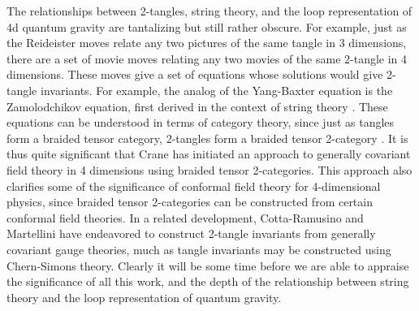 The relationships between 2-tangles, string theory, and the loop
representation of 4d quantum gravity are tantalizing but still rather
obscure.   For example, just as the Reideister moves relate any two
pictures of the same tangle in 3 dimensions, there are a set of movie moves
relating any two movies of the same 2-tangle in 4 dimensions.   These moves
give a set of equations whose solutions would give 2-tangle invariants.
For example, the analog of the Yang-Baxter equation is the Zamolodchikov
equation, first derived in the context of string theory \cite{Zam}.   These
equations can be understood in terms of category theory, since just as
tangles form a braided tensor category, 2-tangles form a braided tensor
2-category \cite{Fischer}.  It is thus quite significant that Crane
\cite{Crane} has initiated an approach to generally covariant field theory
in 4 dimensions using braided tensor 2-categories. This approach also
clarifies some of the significance of conformal field theory for
4-dimensional physics, since braided tensor 2-categories can be constructed
from certain conformal field theories.   In a related development,
Cotta-Ramusino and Martellini \cite{CM} have endeavored to construct
2-tangle invariants from generally covariant gauge theories, much as tangle
invariants may be constructed using Chern-Simons theory.   Clearly it will
be some time before we are able to appraise the significance of all this
work, and the depth of the relationship between string theory and the loop
representation of quantum gravity.

